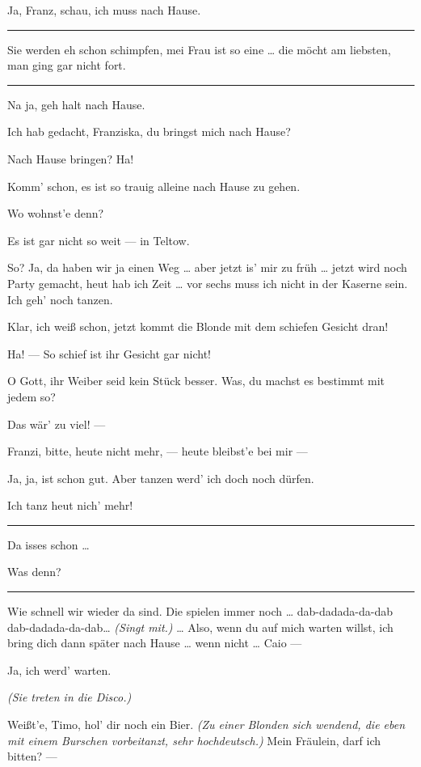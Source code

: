 \documentclass[
	final,
	a4paper,
	ngerman,
	mpinclude = true, %
	twoside = true,
	open = right,
	cleardoublepage = plain,
	DIV = 13,
	BCOR = 1cm,
	titlepage = firstiscover,
	]{scrbook}
\newcommand{\direction}[1]{\textit{(#1)}}
\newenvironment{deletion}{%
		\vspace{0.25\baselineskip}
		\hrule
		\vspace{0.25\baselineskip}
		\color{darkgray}
	}{
		\color{black}
		\vspace{0.25\baselineskip}
		\hrule 
		\vspace{0.25\baselineskip}
	}
\newcommand{\thecharacter}[1]{\textup{\textsc{#1}}\xspace}
\newcommand{\thesoldatin}{\thecharacter{Franziska}}
\newcommand{\thepraktikant}{\thecharacter{Timo}}
\newcommand{\character}[1]{\item[#1:]}
\newcommand{\soldatin}{\character{\thesoldatin}}
\newcommand{\praktikant}{\character{\thepraktikant}}
\begin{document}
\begin{play}
	\praktikant
	Ja, Franz, schau, ich muss nach Hause.
	\begin{deletion}
		Sie werden eh schon schimpfen, mei Frau ist so eine \ldots{} die möcht am liebsten, man ging gar nicht fort.
	\end{deletion}

	\soldatin
	Na ja, geh halt nach Hause.

	\praktikant
	Ich hab  gedacht, Franziska, du bringst mich nach Hause?

	\soldatin
	Nach Hause bringen? Ha!

	\praktikant
	Komm' schon, es ist so trauig alleine nach Hause zu gehen.

	\soldatin
	Wo wohnst'e denn?

	\praktikant
	Es ist gar nicht so weit --- in Teltow.

	\soldatin
	So? Ja, da haben wir ja einen Weg \ldots{} aber jetzt is' mir zu früh \ldots{} jetzt wird noch Party gemacht, heut hab ich Zeit \ldots{} vor sechs muss ich nicht in der Kaserne sein. Ich geh' noch tanzen.

	\praktikant
	Klar, ich weiß schon, jetzt kommt die Blonde mit dem schiefen Gesicht dran!

	\soldatin
	Ha! --- So schief ist ihr Gesicht gar nicht!

	\praktikant
	O Gott, ihr Weiber seid kein Stück besser. Was, du machst es bestimmt mit jedem so?

	\soldatin
	Das wär' zu viel! ---

	\praktikant
	Franzi, bitte, heute nicht mehr, --- heute bleibst'e bei mir ---

	\soldatin
	Ja, ja, ist schon gut. Aber tanzen werd' ich doch noch dürfen.

	\praktikant
	Ich tanz heut nich' mehr!

	\begin{deletion}
	\soldatin
	Da isses schon \ldots{}

	\praktikant
	Was denn?
	\end{deletion}

	\soldatin
	Wie schnell wir wieder da sind. Die spielen immer noch \ldots{} dab-dadada-da-dab dab-dadada-da-dab\ldots{} \direction{Singt mit.} \ldots{} Also, wenn du auf mich warten willst, ich bring dich dann später nach Hause \ldots{} wenn nicht \ldots{} Caio ---

	\praktikant
	Ja, ich werd' warten.

	\direction{Sie treten in die Disco.}

	\soldatin
	Weißt'e, Timo, hol' dir noch ein Bier. \direction{Zu einer Blonden sich wendend, die eben mit einem Burschen vorbeitanzt, sehr hochdeutsch.} Mein Fräulein, darf ich bitten? ---
\end{play}
\end{document}

